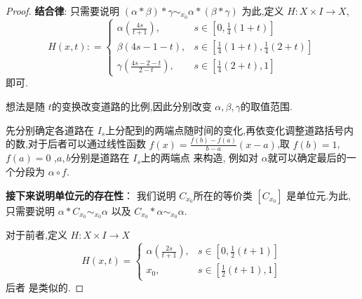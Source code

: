 \documentclass[../../几何与拓扑.tex]{subfiles}
\begin{document}
\begin{proof}

    \textbf{结合律}:
    只需要说明 \(  \left( \alpha *\beta  \right)* \gamma \sim _{x_0} \alpha *\left( \beta * \gamma  \right)    \) 
    为此,定义 \(  H:X \times I \to  X  \), \[
    H\left( x,t \right): =  \begin{cases} \alpha \left( \frac{4s}{t+ 1} \right) ,& s \in [0, \frac{1}{4}\left( 1+ t \right) ]\\ 
      \beta \left( 4s-1-t \right),& s \in [ \frac{1}{4}\left( 1+ t \right) ,\frac{1}{4}\left( 2+ t \right) ]  \\ 
      \gamma \left( \frac{4s-2-t }{2-t }  \right),& s \in [\frac{1}{4}\left( 2+ t \right),1 ] \end{cases}  
    \] 即可.
    \begin{note}
    
        想法是随 \(  t  \)的变换改变道路的比例,因此分别改变 \(   \alpha , \beta , \gamma   \)的取值范围.
        
        先分别确定各道路在 \(  I _{s}  \)上分配到的两端点随时间的变化,再依变化调整道路括号内的数,对于后者可以通过线性函数 \(  f\left( x \right)=  \frac{f\left( b \right)-f\left( a \right)   }{b-a } \left( x-a \right)     \),取 \(  f\left( b \right)= 1   \), \(  f\left( a \right)= 0   \)     ,\(  a,b  \)分别是道路在 \(  I _{s}  \)上的两端点   来构造,
        例如对 \(  \alpha   \)就可以确定最后的一个分段为 \(  \alpha \circ f  \).  
    
    \end{note}

    \textbf{接下来说明单位元的存在性}：
    我们说明 \(  C_{x_0}  \)所在的等价类 \(  [C_{x_0}]  \) 是单位元.为此,只需要说明 \(   \alpha *C_{x_0} \sim _{x_0} \alpha   \)  以及 \(  C_{x_0} * \alpha \sim  _{x_0} \alpha  \).
    
    对于前者,定义 \(  H: X \times  I \to X  \) \[
    H\left( x,t \right) = \begin{cases}  \alpha \left( \frac{2s}{t+ 1} \right),& s \in [0,\frac{1}{2}\left( t+ 1 \right)  ]\\ 
    x_0,&  s \in  [\frac{1}{2}\left( t+ 1 \right),1 ] \end{cases}  
    \] 后者 是类似的.


\end{proof}
\end{document}
